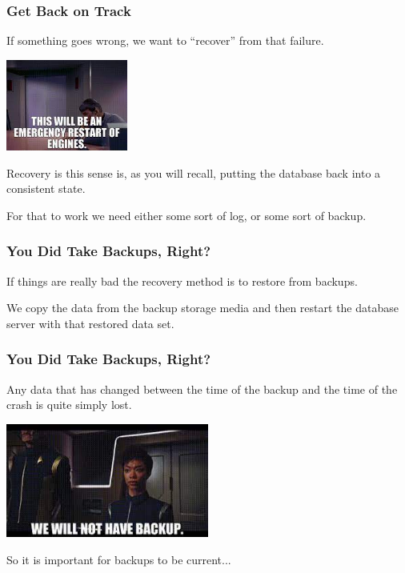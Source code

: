 \begin{frame}
\frametitle{Get Back on Track}

If something goes wrong, we want to ``recover'' from that failure. 

\begin{center}
	\includegraphics[width=0.3\textwidth]{images/restart.jpg}
\end{center}

Recovery is this sense is, as you will recall, putting the database back into a consistent state. 

For that to work we need either some sort of log, or some sort of backup.

\end{frame}


\begin{frame}
\frametitle{You Did Take Backups, Right?}

If things are really bad the recovery method is to restore from backups. 

We copy the data from the backup storage media and then restart the database server with that restored data set. 

\end{frame}


\begin{frame}
\frametitle{You Did Take Backups, Right?}


Any data that has changed between the time of the backup and the time of the crash is quite simply lost. 

\begin{center}
	\includegraphics[width=0.5\textwidth]{images/nobackup.jpg}
\end{center}

So it is important for backups to be current...


\end{frame}



